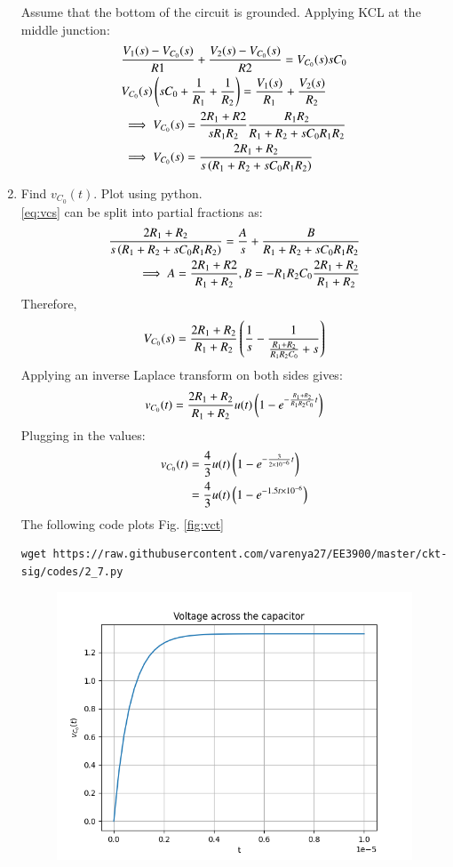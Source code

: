 \documentclass[journal,12pt,twocolumn]{IEEEtran}
\renewcommand\thesection{\arabic{section}}
\begin{document}
\begin{enumerate}[label=\arabic*.,ref=\thesection.\theenumi]
	Assume that the bottom of the circuit is grounded. Applying KCL at the middle junction:
	\begin{align}
	    &\frac{V_1(s)-V_{C_0}(s)}{R1} + \frac{V_2(s)-V_{C_0}(s)}{R2} = V_{C_0}(s)sC_0\\
	   & V_{C_0}(s)\left(sC_0+\frac{1}{R_1}+\frac{1}{R_2}\right)=\frac{V_1(s)}{R_1}+\frac{V_2(s)}{R_2}\\
	    &\implies V_{C_0}(s) = \frac{2R_1+R2}{sR_1R_2}\frac{R_1R_2}{R_1+R_2+sC_0R_1R_2}\\
	    &\implies V_{C_0}(s) = \frac{2R_1+R_2}{s\left(R_1+R_2+sC_0R_1R_2\right)}\label{eq:vcs} 
	\end{align}
	\item Find $v_{C_0}(t)$.  Plot using python.\\
	\solution \eqref{eq:vcs} can be split into partial fractions as:
	\begin{align}
	     \frac{2R_1+R_2}{s\left(R_1+R_2+sC_0R_1R_2\right)} = \frac{A}{s}+\frac{B}{R_1+R_2+sC_0R_1R_2} \\
	     \implies A = \frac{2R_1+R2}{R_1+R_2}, B = -R_1R_2C_0\frac{2R_1+R_2}{R_1+R_2}
	\end{align}
	Therefore,
	\begin{align}
	    V_{C_0}(s)= \frac{2R_1+R_2}{R_1+R_2}\left(\frac{1}{s}-\frac{1}{\frac{R_1+R_2}{R_1R_2C_0}+s}\right)
	\end{align}
	Applying an inverse Laplace transform on both sides gives:
	\begin{align}
	    v_{C_0}(t) = \frac{2R_1+R_2}{R_1+R_2}u(t)\left(1-e^{-\frac{R_1+R_2}{R_1R_2C_0}t}\right)
	\end{align}
	Plugging in the values:
	\begin{align}
	     v_{C_0}(t) &= \frac{4}{3}u(t)\left(1-e^{-\frac{3}{2\times10^{-6}}t}\right)\\
	     &= \frac{4}{3}u(t)\left(1-e^{-1.5t\times10^{-6}}\right)
	\end{align}
	The following code plots Fig. \ref{fig:vct}
	\begin{lstlisting}
wget https://raw.githubusercontent.com/varenya27/EE3900/master/ckt-sig/codes/2_7.py
\end{lstlisting}
	\begin{figure}[h!]
	    \centering
	    \includegraphics[width=\columnwidth]{figs/vct.png}

\end{figure}
\end{enumerate}
\end{document}

